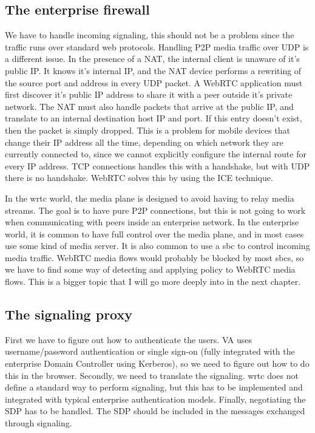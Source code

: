 \subsection{The enterprise firewall}
We have to handle incoming signaling, this should not be a problem since the traffic runs over standard web protocols. Handling P2P media traffic over UDP is a different issue. In the presence of a NAT, the internal client is unaware of it's public IP. It knows it's internal IP, and the NAT device performs a rewriting of the source port and address in every UDP packet. A WebRTC application must first discover it's public IP address to share it with a peer outside it's private network. The NAT must also handle packets that arrive at the public IP, and translate to an internal destination host IP and port. If this entry doesn't exist, then the packet is simply dropped. This is a problem for mobile devices that change their IP address all the time, depending on which network they are currently connected to, since we cannot explicitly configure the internal route for every IP address. TCP connections handles this with a handshake, but with UDP there is no handshake. WebRTC solves this by using the ICE technique.

In the \gls{wrtc} world, the media plane is designed to avoid having to relay media streams. The goal is to have pure P2P connections, but this is not going to work when communicating with peers inside an enterprise network. In the enterprise world, it is common to have full control over the media plane, and in most cases use some kind of media server. It is also common to use a \gls{sbc} to control incoming media traffic. WebRTC media flows would probably be blocked by most \gls{sbc}s, so we have to find some way of detecting and applying policy to WebRTC media flows. This is a bigger topic that I will go more deeply into in the next chapter.

\subsection{The signaling proxy}
First we have to figure out how to authenticate the users. VA uses username/password authentication or single sign-on (fully integrated with the enterprise Domain Controller using Kerberos), so we need to figure out how to do this in the browser. Secondly, we need to translate the signaling. \gls{wrtc} does not define a standard way to perform signaling, but this has to be implemented and integrated with typical enterprise authentication models. Finally, negotiating the SDP has to be handled. The SDP should be included in the messages exchanged through signaling.
 

